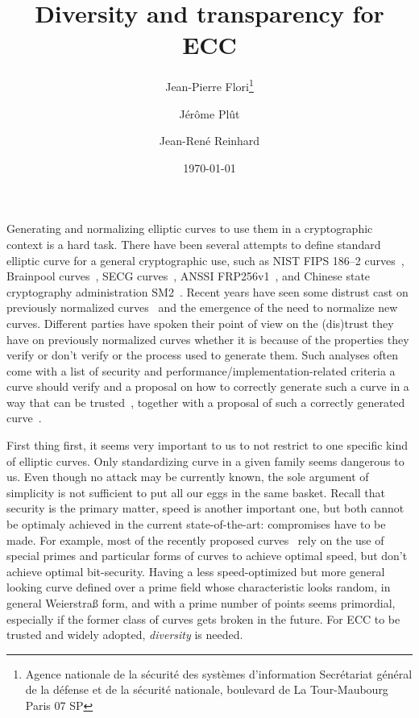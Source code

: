 \documentclass[twocolumn,letterpaper]{article}
\title{Diversity and transparency for ECC}
\author{Jean-Pierre Flori\thanks{Agence nationale de la sécurité des systèmes d'information\newline%
Secrétariat général de la défense et de la sécurité nationale\newline%
51, boulevard de La Tour-Maubourg\newline%
75700 Paris 07 SP}%
\and Jérôme Plût\footnotemark[1] \and Jean-René Reinhard\footnotemark[1]}
\date{\today}
\begin{document}
\sloppy

\maketitle

Generating and normalizing elliptic curves to use them in a cryptographic
context is a hard task.
There have been several attempts to define standard elliptic curve
for a general cryptographic use,
such as NIST FIPS 186--2 curves~\cite{nist2000fips186-2},
Brainpool curves~\cite{rfc5639},
SECG curves~\cite{certicom2010sec2},
ANSSI FRP256v1~\cite{jorf2011ce},
and Chinese state cryptography administration SM2~\cite{oscca2010sm2}.
Recent years have seen some distrust cast on previously normalized
curves~\cite{rfc5639,nist2000fips186-2,jorf2011ce,oscca2010sm2}
and the emergence of the need to normalize new curves.
Different parties have spoken their point of view on the (dis)trust they have
on previously normalized curves whether it is because of
the properties they verify or don't verify
or the process used to generate them.
Such analyses often come with
a list of security and performance/implementation-related criteria
a curve should verify
and a proposal on how to correctly generate such a curve in a way that can be
trusted~\cite{safecurves,msr2014bcln,eprint2014brainpool,eprint2013abgr},
together with a proposal of such a correctly generated
curve~\cite{pkc2006bernstein,msr2014bcln,eprint2013abgr}.

First thing first, it seems very important to us to not restrict
to one specific kind of elliptic curves.
Only standardizing curve in a given family seems dangerous to us.
Even though no attack may be currently known, the sole argument of simplicity
is not sufficient to put all our eggs in the same basket.
Recall that security is the primary matter, speed is another important one,
but both cannot be optimaly achieved in the current state-of-the-art:
compromises have to be made.
For example, most of the recently proposed curves~\cite{pkc2006bernstein,msr2014bcln,eprint2013abgr}
rely on the use of special primes and particular forms of curves to achieve optimal speed,
but don't achieve optimal bit-security.
Having a less speed-optimized but more general looking curve
defined over a prime field whose characteristic looks random,
in general Weierstraß form, and with a prime number of points
seems primordial,
especially if the former class of curves gets broken in the future.
For ECC to be trusted and widely adopted, \emph{diversity} is needed.
\end{document}
